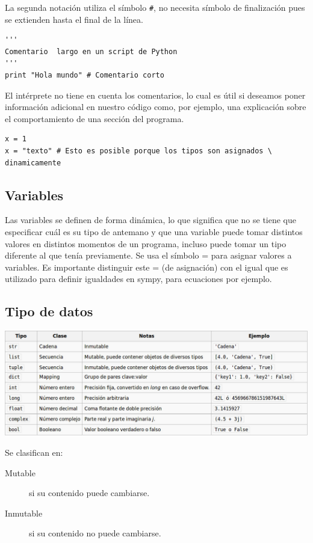  La segunda notación utiliza el símbolo \verb~#~, no necesita símbolo de finalización pues se extienden hasta el final de la línea.

 \begin{lstlisting}
'''
Comentario  largo en un script de Python
'''
print "Hola mundo" # Comentario corto
\end{lstlisting}

El intérprete no tiene en cuenta los comentarios, lo cual es útil si deseamos poner información adicional en nuestro código como, por ejemplo, una explicación sobre el comportamiento de una sección del programa.






\begin{lstlisting}
x = 1
x = "texto" # Esto es posible porque los tipos son asignados \
dinamicamente
\end{lstlisting}



\subsection{Variables}
Las variables se definen de forma dinámica, lo que significa que no se tiene que especificar cuál es su tipo de antemano y que una variable puede tomar distintos valores en distintos momentos de un programa, incluso puede tomar
 un tipo diferente al que tenía previamente. Se usa el símbolo = para asignar valores a variables. Es importante distinguir este = (de asignación) con el igual que es utilizado para definir igualdades en sympy, para ecuaciones por ejemplo.




\subsection{Tipo de datos}

\includegraphics[scale=.4]{imagenes/tipo_datos.jpg}

Se clasifican en:
\begin{description}
 \item[Mutable] si su contenido puede cambiarse.
 \item[Inmutable] si su contenido no puede cambiarse.
\end{description}

